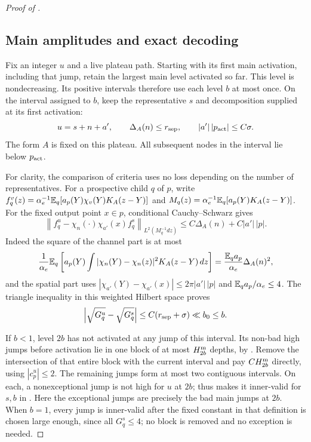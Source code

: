 \begin{proof}[Proof of ]
\subsection*{Main amplitudes and exact decoding}

Fix an integer $u$ and a live plateau path.  Starting with its first main
activation, including that jump, retain the largest main level activated
so far.  This level is nondecreasing.  Its positive intervals therefore
use each level $b$ at most once.  On the interval assigned to $b$, keep
the representative $s$ and decomposition supplied at its first
activation:
\begin{equation}\label{eq:09-main-decomposition}
 u=s+n+a',\qquad \Delta_A(n)\le r_{\rm sep},\qquad
 |a'|\,|p_{\rm act}|\le C\sigma.
\end{equation}
The form $A$ is fixed on this plateau.  All subsequent nodes in the
interval lie below $p_{\rm act}$.

For clarity, the comparison of criteria uses no loss depending on the
number of representatives.  For a prospective child $q$ of $p$, write
$f_q^v(z)=\alpha_e^{-1}\mathbb E_q[a_p(Y)\chi_v(Y)K_A(z-Y)]$ and
$M_q(z)=\alpha_e^{-1}\mathbb E_q[a_p(Y)K_A(z-Y)]$.
For the fixed output point $x\in p$, conditional Cauchy--Schwarz gives
\[
 \left\|f_q^u-\chi_n(\cdot)\chi_{a'}(x)f_q^s
       \right\|_{L^2(M_q^{-1}dz)}
 \le C\Delta_A(n)+C|a'|\,|p|.
\]
Indeed the square of the channel part is at most
\[
 \frac1{\alpha_e}\mathbb E_q\left[
     a_p(Y)\int |\chi_n(Y)-\chi_n(z)|^2K_A(z-Y)\,dz\right]
 =\frac{\mathbb E_q a_p}{\alpha_e}\Delta_A(n)^2,
\]
and the spatial part uses
$|\chi_{a'}(Y)-\chi_{a'}(x)|\le2\pi|a'|\,|p|$ and
$\mathbb E_q a_p/\alpha_e\le4$.  The triangle inequality in this weighted
Hilbert space proves
\begin{equation}\label{eq:09-criterion-comparison}
 \left|\sqrt{G_q^u}-\sqrt{G_q^s}\right|
 \le C(r_{\rm sep}+\sigma)\ll b_0\le b.
\end{equation}

If $b<1$, level $2b$ has not activated at any jump of this
interval.  Its non-bad high jumps before activation lie in one block of
at most $H_{2b}^{\rm m}$ depths, by .  Remove the
intersection of that entire block with the current interval and pay
$C H_{2b}^{\rm m}$ directly, using $|c_p^u|\le2$.  The remaining jumps
form at most two contiguous intervals.  On each, a nonexceptional jump
is not high for $u$ at $2b$; thus
 makes it inner-valid for $s,b$ in
.  Here the exceptional jumps are precisely the
bad main jumps at $2b$.  When $b=1$, every jump is inner-valid after the
fixed constant in that definition is chosen large enough, since all
$G_q^s\le4$; no block is removed and no exception is needed.


\end{proof}
